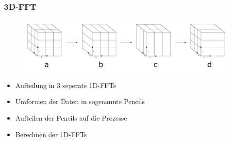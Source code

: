\frame
{
	\frametitle{3D-FFT}
	\begin{figure}[h!]
		\centering
		\includegraphics[width=\linewidth, keepaspectratio]{../Pictures/PencilsDecompositionPres.png}
	\end{figure}
	\begin{itemize}
		\item Aufteilung in 3 seperate 1D-FFTs
		\item Umformen der Daten in sogenannte Pencils
		\item Aufteilen der Pencils auf die Prozesse
		\item Berechnen der 1D-FFTs
	\end{itemize}
		
	
}

